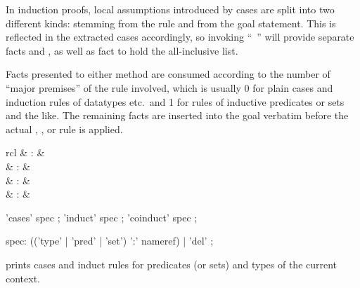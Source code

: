 \begin{isabellebody}
\begin{isamarkuptext}
  In induction proofs, local assumptions introduced by cases are split
  into two different kinds:  stemming from the rule and
   from the goal statement.  This is reflected in the
  extracted cases accordingly, so invoking ``\hyperlink{command.case}{\mbox{}}~'' will provide separate facts  and ,
  as well as fact  to hold the all-inclusive list.

  \medskip Facts presented to either method are consumed according to
  the number of ``major premises'' of the rule involved, which is
  usually 0 for plain cases and induction rules of datatypes etc.\ and
  1 for rules of inductive predicates or sets and the like.  The
  remaining facts are inserted into the goal verbatim before the
  actual , , or  rule is
  applied.%
\end{isamarkuptext}%
\isamarkuptrue%
%
\isamarkuptrue%
%
\begin{isamarkuptext}%
\begin{matharray}{rcl}
    \hypertarget{command.print-induct-rules}{\hyperlink{command.print-induct-rules}{\mbox{}}}\isa{{\isachardoublequote}\isactrlsup {\isacharasterisk}{\isachardoublequote}} & : &  \\
    \hypertarget{attribute.cases}{\hyperlink{attribute.cases}{\mbox{}}} & : & \isaratt \\
    \hypertarget{attribute.induct}{\hyperlink{attribute.induct}{\mbox{}}} & : & \isaratt \\
    \hypertarget{attribute.coinduct}{\hyperlink{attribute.coinduct}{\mbox{}}} & : & \isaratt \\
  \end{matharray}

  \begin{rail}
    'cases' spec
    ;
    'induct' spec
    ;
    'coinduct' spec
    ;

    spec: (('type' | 'pred' | 'set') ':' nameref) | 'del'
    ;
  \end{rail}

  \begin{descr}

  \item [\hyperlink{command.print-induct-rules}{\mbox{\isa{\isacommand{print{\isacharunderscore}induct{\isacharunderscore}rules}}}}] prints cases and induct
  rules for predicates (or sets) and types of the current context.
  

\end{descr}
\end{isamarkuptext}
\end{isabellebody}

